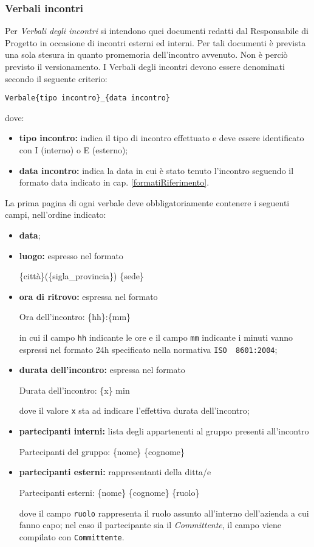{{		\subsubsection{Verbali incontri} {
			\label{VerbInc}
			Per \emph{Verbali degli incontri} si intendono quei documenti redatti dal Responsabile di Progetto in occasione di 
			incontri esterni ed interni. Per tali documenti è prevista  una sola stesura in quanto promemoria 
			dell'incontro avvenuto.
			Non è perciò previsto il versionamento. I Verbali degli incontri devono essere denominati secondo il 
			seguente criterio:
			\begin{center}
				\texttt{Verbale\{tipo incontro\}\_\{data incontro\}}
			\end{center}
			dove:
			\begin{itemize}
				\item \textbf{tipo incontro:} indica il tipo di incontro effettuato e deve essere identificato con I 
				(interno) o E (esterno);
				\item \textbf{data incontro:} indica la data in cui è stato tenuto l'incontro seguendo il formato data indicato in cap. \ref{formatiRiferimento}.
			\end{itemize}
			La prima pagina di ogni verbale deve obbligatoriamente contenere i seguenti campi, nell'ordine indicato:
			\begin{itemize}
				\item \textbf{data};
				\item \textbf{luogo:} espresso nel formato
				\begin{center}
					\{città\}(\{sigla\_provincia\}) \{sede\}
				\end{center}
				\item \textbf{ora di ritrovo:} espressa nel formato
				\begin{center}
					Ora dell'incontro: \{hh\}:\{mm\}
				\end{center}
				in cui il campo \texttt{hh} indicante le ore e il campo \texttt{mm} indicante i minuti vanno espressi nel formato 24h specificato nella normativa \texttt{ISO\g~ 8601:2004};
				\item \textbf{durata dell'incontro:} espressa nel formato
				\begin{center}
					Durata dell'incontro: \{x\} min
				\end{center}
				dove il valore \texttt{x} sta ad indicare l'effettiva durata dell'incontro;
				\item \textbf{partecipanti interni:} lista degli appartenenti al gruppo \textit{\ggt} presenti all'incontro
				\begin{center}
					Partecipanti del gruppo: \{nome\} \{cognome\}
				\end{center}
				\item \textbf{partecipanti esterni:} rappresentanti della ditta/e
				\begin{center}
					Partecipanti esterni: \{nome\} \{cognome\} \{ruolo\}
				\end{center}
				dove il campo \texttt{ruolo} rappresenta il ruolo assunto all'interno dell'azienda a cui fanno capo; nel caso il partecipante sia il \emph{Committente}, il campo viene compilato con \texttt{Committente}.
				

\end{itemize}}}}
